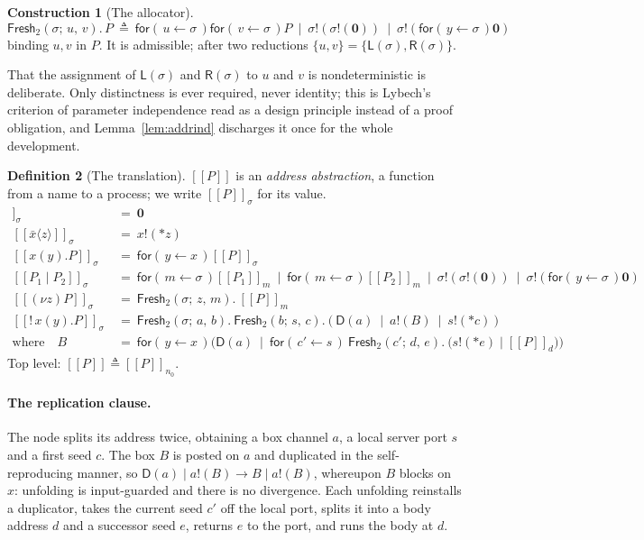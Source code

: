 \documentclass[11pt]{article}
\theoremstyle{definition}
\newtheorem{definition}{Definition}[section]
\newtheorem{construction}[definition]{Construction}
\theoremstyle{plain}
\theoremstyle{remark}
\newcommand{\drp}[1]{{*}#1}
\newcommand{\inp}[3]{\mathsf{for}(\,#1 \leftarrow #2\,)#3}
\newcommand{\out}[2]{#1!(#2)}
\newcommand{\enc}[1]{[\![#1]\!]}
\newcommand{\nil}{\mathbf{0}}
\newcommand{\Lft}{\mathsf{L}}
\newcommand{\Rgt}{\mathsf{R}}
\newcommand{\Frsh}{\mathsf{Fresh}_2}
\newcommand{\Dup}{\mathsf{D}}
\begin{document}
\begin{construction}[The allocator]
\[
  \Frsh(\sigma;\, u,\, v).\,P
  \ \triangleq\
  \inp{u}{\sigma}{\inp{v}{\sigma}{P}}
  \ \mid\ \out{\sigma}{\out{\sigma}{\nil}}
  \ \mid\ \out{\sigma}{\inp{y}{\sigma}{\nil}}
\]
binding $u,v$ in $P$. It is admissible; after two reductions
$\{u,v\} = \{\Lft(\sigma),\Rgt(\sigma)\}$.
\end{construction}

That the assignment of $\Lft(\sigma)$ and $\Rgt(\sigma)$ to $u$ and $v$
is nondeterministic is deliberate. Only distinctness is ever required,
never identity; this is Lybech's criterion of parameter independence read
as a design principle instead of a proof obligation, and
Lemma~\ref{lem:addrind} discharges it once for the whole development.

\begin{definition}[The translation]\label{def:translation}
$\enc{P}$ is an \emph{address abstraction}, a function from a name to a
process; we write $\enc{P}_\sigma$ for its value.
\begin{align*}
\enc{\nil}_\sigma \ &=\ \nil \\[2pt]
\enc{\bar x\langle z\rangle}_\sigma \ &=\ \out{x}{\drp{z}} \\[2pt]
\enc{x(y).P}_\sigma \ &=\ \inp{y}{x}{\enc{P}_\sigma} \\[2pt]
\enc{P_1 \mid P_2}_\sigma \ &=\
  \inp{m}{\sigma}{\enc{P_1}_m}
  \ \mid\ \inp{m}{\sigma}{\enc{P_2}_m}
  \ \mid\ \out{\sigma}{\out{\sigma}{\nil}}
  \ \mid\ \out{\sigma}{\inp{y}{\sigma}{\nil}} \\[2pt]
\enc{(\nu z)P}_\sigma \ &=\ \Frsh(\sigma;\, z,\, m).\ \enc{P}_m \\[2pt]
\enc{!\,x(y).P}_\sigma \ &=\
  \Frsh(\sigma;\, a,\, b).\ \Frsh(b;\, s,\, c).\
  \big(\ \Dup(a) \ \mid\ \out{a}{B} \ \mid\ \out{s}{\drp{c}}\ \big)
\\
\text{where}\quad
B \ &=\ \inp{y}{x}{\Big(\Dup(a) \ \mid\
        \inp{c'}{s}{\ \Frsh(c';\, d,\, e).\ \big(\out{s}{\drp{e}} \mid \enc{P}_d\big)}\Big)}
\end{align*}
Top level: $\enc{P} \triangleq \enc{P}_{n_0}$.
\end{definition}

\paragraph{The replication clause.}
The node splits its address twice, obtaining a box channel $a$, a local
server port $s$ and a first seed $c$. The box $B$ is posted on $a$ and
duplicated in the self-reproducing manner, so
$\Dup(a) \mid \out{a}{B} \to B \mid \out{a}{B}$, whereupon $B$ blocks on
$x$: unfolding is input-guarded and there is no divergence. Each
unfolding reinstalls a duplicator, takes the current seed $c'$ off the
local port, splits it into a body address $d$ and a successor seed $e$,
returns $e$ to the port, and runs the body at $d$.
\end{document}
